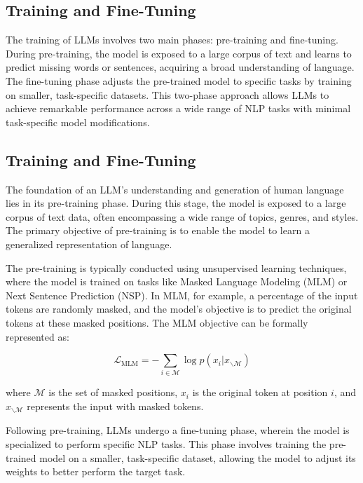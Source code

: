         \subsection{Training and Fine-Tuning}
            The training of LLMs involves two main phases: pre-training and fine-tuning. During pre-training, the model is exposed to a large corpus of text and learns to predict missing words or sentences, acquiring a broad understanding of language. The fine-tuning phase adjusts the pre-trained model to specific tasks by training on smaller, task-specific datasets. This two-phase approach allows LLMs to achieve remarkable performance across a wide range of NLP tasks with minimal task-specific model modifications.

            \subsection{Training and Fine-Tuning}
            The foundation of an LLM's understanding and generation of human language lies in its pre-training phase. During this stage, the model is exposed to a large corpus of text data, often encompassing a wide range of topics, genres, and styles. The primary objective of pre-training is to enable the model to learn a generalized representation of language.
            
            The pre-training is typically conducted using unsupervised learning techniques, where the model is trained on tasks like Masked Language Modeling (MLM) or Next Sentence Prediction (NSP). In MLM, for example, a percentage of the input tokens are randomly masked, and the model's objective is to predict the original tokens at these masked positions. The MLM objective can be formally represented as:
            
            \begin{equation}
            \mathcal{L}_{\text{MLM}} = -\sum_{i \in \mathcal{M}} \log p(x_i | x_{\backslash \mathcal{M}})
            \end{equation}
            
            where $\mathcal{M}$ is the set of masked positions, $x_i$ is the original token at position $i$, and $x_{\backslash \mathcal{M}}$ represents the input with masked tokens.
            \vspace*{0.2cm}

            Following pre-training, LLMs undergo a fine-tuning phase, wherein the model is specialized to perform specific NLP tasks. This phase involves training the pre-trained model on a smaller, task-specific dataset, allowing the model to adjust its weights to better perform the target task.
            
